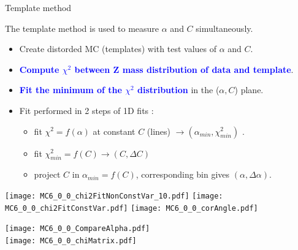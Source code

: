 \begin{frame}{Template method}
\begin{minipage}{0.59\linewidth}
  The template method is used to measure $\alpha$ and $C$ simultaneously.
\begin{itemize}
\item Create distorded MC (templates) with test values of $\alpha$ and $C$.
\item \textcolor{blue}{\bf Compute $\chi^2$ between Z mass distribution of data and template}.
\item \textcolor{blue}{\bf Fit the minimum of the $\chi^2$ distribution} in the ($\alpha,C$) plane.
\item Fit performed in 2 steps of 1D fits : 
\begin{itemize}
\item fit $\chi^2=f(\alpha)$ at constant $C$ (lines) $\rightarrow (\alpha_{min}, \chi^2_{min})$ .
\item fit $\chi^2_{min}=f(C)\rightarrow (C, \Delta C)$
\item project $C$ in $\alpha_{min}=f(C)$, corresponding bin gives $(\alpha, \Delta\alpha)$.
\end{itemize}
\end{itemize}
  \texttt{[image: MC6\_0\_0\_chi2FitNonConstVar\_10.pdf]}
  \texttt{[image: MC6\_0\_0\_chi2FitConstVar.pdf]}
  \texttt{[image: MC6\_0\_0\_corAngle.pdf]}
\end{minipage}
\hfill
\begin{minipage}{0.4\linewidth}
  \texttt{[image: MC6\_0\_0\_CompareAlpha.pdf]}\\
  \texttt{[image: MC6\_0\_0\_chiMatrix.pdf]}\\
\end{minipage}
\end{frame}

